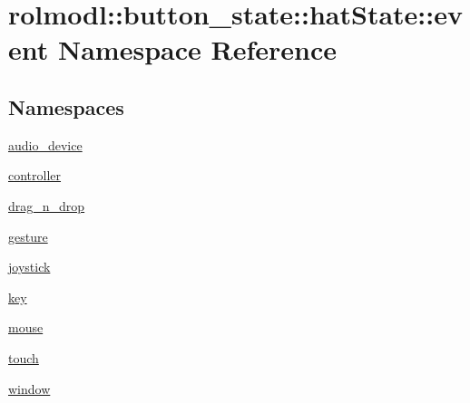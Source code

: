\hypertarget{namespacerolmodl_1_1button__state_1_1hat_state_1_1event}{}\section{rolmodl\+::button\+\_\+state\+::hat\+State\+::event Namespace Reference}
\label{namespacerolmodl_1_1button__state_1_1hat_state_1_1event}
\subsection*{Namespaces}
\begin{DoxyCompactItemize}
\item 
 \mbox{\hyperlink{namespacerolmodl_1_1button__state_1_1hat_state_1_1event_1_1audio__device}{audio\+\_\+device}}
\item 
 \mbox{\hyperlink{namespacerolmodl_1_1button__state_1_1hat_state_1_1event_1_1controller}{controller}}
\item 
 \mbox{\hyperlink{namespacerolmodl_1_1button__state_1_1hat_state_1_1event_1_1drag__n__drop}{drag\+\_\+n\+\_\+drop}}
\item 
 \mbox{\hyperlink{namespacerolmodl_1_1button__state_1_1hat_state_1_1event_1_1gesture}{gesture}}
\item 
 \mbox{\hyperlink{namespacerolmodl_1_1button__state_1_1hat_state_1_1event_1_1joystick}{joystick}}
\item 
 \mbox{\hyperlink{namespacerolmodl_1_1button__state_1_1hat_state_1_1event_1_1key}{key}}
\item 
 \mbox{\hyperlink{namespacerolmodl_1_1button__state_1_1hat_state_1_1event_1_1mouse}{mouse}}
\item 
 \mbox{\hyperlink{namespacerolmodl_1_1button__state_1_1hat_state_1_1event_1_1touch}{touch}}
\item 
 \mbox{\hyperlink{namespacerolmodl_1_1button__state_1_1hat_state_1_1event_1_1window}{window}}
\end{DoxyCompactItemize}
